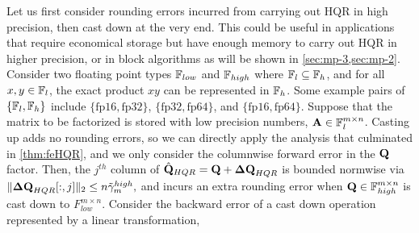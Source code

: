 Let us first consider rounding errors incurred from carrying out HQR in high precision, then cast down at the very end.
This could be useful in applications that require economical storage but have enough memory to carry out HQR in higher precision, or in block algorithms as will be shown in \cref{sec:mp-3,sec:mp-2}.
Consider two floating point types $\mathbb{F}_{low}$ and $\mathbb{F}_{high}$ where $\mathbb{F}_{l}\subseteq \mathbb{F}_{h}$, and for all $x,y\in\mathbb{F}_{l}$, the exact product $xy$ can be represented in $\mathbb{F}_{h}$.
Some example pairs of $\{\mathbb{F}_{l}, \mathbb{F}_{h}\}$ include $\{\text{fp16}, \text{fp32}\}$, $\{\text{fp32}, \text{fp64}\}$, and $\{\text{fp16}, \text{fp64}\}$.
Suppose that the matrix to be factorized is stored with low precision numbers, $\mathbf{A}\in\mathbb{F}_{l}^{m\times n}$.
Casting up adds no rounding errors, so we can directly apply the analysis that culminated in \cref{thm:feHQR}, and we only consider the columnwise forward error in the $\mathbf{Q}$ factor.
Then, the $j^{th}$ column of $\hat{\mathbf{Q}}_{HQR} = \mathbf{Q} + \mathbf{\Delta Q}_{HQR}$ is bounded normwise via $\|\mathbf{\Delta Q}_{HQR}[:,j]\|_2 \leq n\tilde{\gamma}_{m}^{high},$ and incurs an extra rounding error when $\mathbf{Q}\in\mathbb{F}_{high}^{m\times n}$ is cast down to $F_{low}^{m\times n}$.
Consider the backward error of a cast down operation represented by a linear transformation, 

